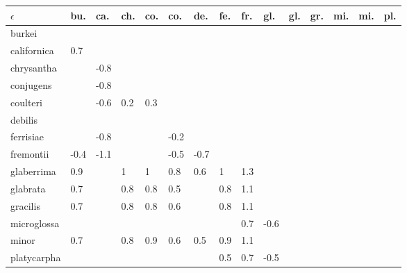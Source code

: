 \begin{table}[ht]
\centering
\begin{tabular}{lllllllllllllll}
  \hline
$\epsilon$ & bu. & ca. & ch. & co. & co. & de. & fe. & fr. & gl. & gl. & gr. & mi. & mi. & pl. \\ 
  \hline
burkei &  &  &  &  &  &  &  &  &  &  &  &  &  &  \\ 
  californica & 0.7 &  &  &  &  &  &  &  &  &  &  &  &  &  \\ 
  chrysantha &  & -0.8 &  &  &  &  &  &  &  &  &  &  &  &  \\ 
  conjugens &  & -0.8 &  &  &  &  &  &  &  &  &  &  &  &  \\ 
  coulteri &  & -0.6 & 0.2 & 0.3 &  &  &  &  &  &  &  &  &  &  \\ 
  debilis &  &  &  &  &  &  &  &  &  &  &  &  &  &  \\ 
  ferrisiae &  & -0.8 &  &  & -0.2 &  &  &  &  &  &  &  &  &  \\ 
  fremontii & -0.4 & -1.1 &  &  & -0.5 & -0.7 &  &  &  &  &  &  &  &  \\ 
  glaberrima & 0.9 &  & 1 & 1 & 0.8 & 0.6 & 1 & 1.3 &  &  &  &  &  &  \\ 
  glabrata & 0.7 &  & 0.8 & 0.8 & 0.5 &  & 0.8 & 1.1 &  &  &  &  &  &  \\ 
  gracilis & 0.7 &  & 0.8 & 0.8 & 0.6 &  & 0.8 & 1.1 &  &  &  &  &  &  \\ 
  microglossa &  &  &  &  &  &  &  & 0.7 & -0.6 &  &  &  &  &  \\ 
  minor & 0.7 &  & 0.8 & 0.9 & 0.6 & 0.5 & 0.9 & 1.1 &  &  &  &  &  &  \\ 
  platycarpha &  &  &  &  &  &  & 0.5 & 0.7 & -0.5 &  &  &  &  &  \\ 
   \hline
\end{tabular}
\end{table}
